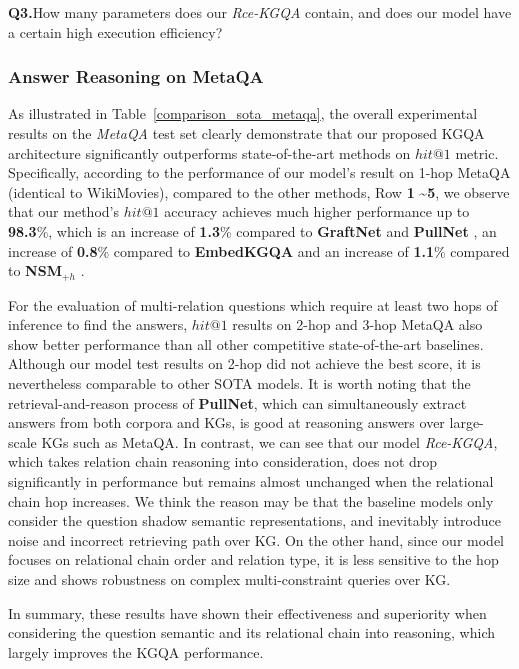 \documentclass[pdflatex,sn-mathphys]{sn-jnl}%
\theoremstyle{thmstyleone}%
\theoremstyle{thmstyletwo}%
\theoremstyle{thmstylethree}%
\begin{document}
\textcolor[rgb]{1,0,0}{
\textbf{Q3.}\quad How many parameters does our \textit{Rce-KGQA} contain, and does our model have a certain high execution efficiency?}

\subsubsection{Answer Reasoning on MetaQA}
\label{ar_metaqa}
As illustrated in Table~\ref{comparison_sota_metaqa}, the overall experimental results on the \textit{MetaQA} test set clearly demonstrate that our proposed KGQA architecture significantly outperforms state-of-the-art methods on $hit@1$ metric. Specifically, according to the performance of our model's result on 1-hop MetaQA (identical to WikiMovies), compared to the other methods, Row \textbf{1} \textasciitilde \textbf{5}, we observe that our method's $hit@1$ accuracy achieves much higher performance up to \textbf{98.3}\%, which is an increase of \textbf{1.3}\% compared to \textbf{GraftNet} \cite{sun2018graftnet} and \textbf{PullNet} \cite{pullnet}, an increase of \textbf{0.8}\% compared to \textbf{EmbedKGQA} \cite{apoorv2020embedKGQA} and an increase of \textbf{1.1}\% compared to \textbf{NSM}$_{+h}$ \cite{he2021stu-teaQA}.

For the evaluation of multi-relation questions which require at least two hops of inference to find the answers, $hit@1$ results on 2-hop and 3-hop MetaQA also show better performance than all other competitive state-of-the-art baselines. Although our model test results on 2-hop did not achieve the best score, it is nevertheless comparable to other SOTA models. It is worth noting that the retrieval-and-reason process of \textbf{PullNet}, which can simultaneously extract answers from both corpora and KGs, is good at reasoning answers over large-scale KGs such as MetaQA. In contrast, we can see that our model \textit{Rce-KGQA}, which takes relation chain reasoning into consideration, does not drop significantly in performance but remains almost unchanged when the relational chain hop increases. We think the reason may be that the baseline models only consider the question shadow semantic representations, and inevitably introduce noise and incorrect retrieving path over KG. On the other hand, since our model focuses on relational chain order and relation type, it is less sensitive to the hop size and shows robustness on complex multi-constraint queries over KG. 

In summary, these results have shown their effectiveness and superiority when considering the question semantic and its relational chain into reasoning, which largely improves the KGQA performance. 
\end{document}
